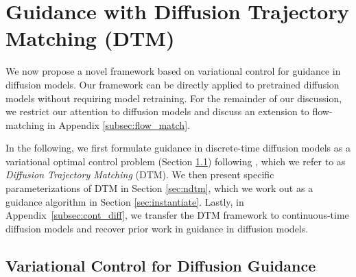 \section{Guidance with Diffusion Trajectory Matching (DTM)}

We now propose a novel framework based on variational control for guidance in diffusion models. Our framework can be directly applied to pretrained diffusion models without requiring model retraining. For the remainder of our discussion, we restrict our attention to diffusion models and discuss an extension to flow-matching \cite{lipman2023flow} in Appendix \ref{subsec:flow_match}.

In the following, we first formulate guidance in discrete-time diffusion models as a variational optimal control problem (Section \ref{sec:dtm}) following \citet{Kappen_2012}, which we refer to as \emph{Diffusion Trajectory Matching} (DTM). We then present specific parameterizations of DTM in Section \ref{sec:ndtm}, which we work out as a guidance algorithm in Section \ref{sec:instantiate}. Lastly, in Appendix~\ref{subsec:cont_diff}, we transfer the DTM framework to continuous-time diffusion models \citep{songscore} and recover prior work in guidance in diffusion models.


\subsection{Variational Control for Diffusion Guidance}
\label{sec:dtm}

